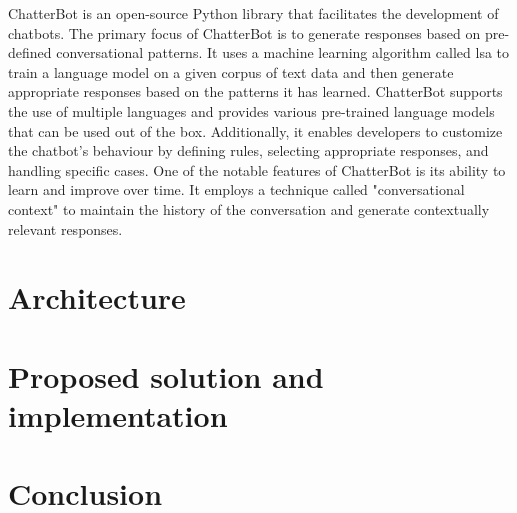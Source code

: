 \documentclass[a4paper,fleqn]{cas-dc}
\begin{document}
ChatterBot \cite{chatterbot} is an open-source Python library that facilitates the development of chatbots. The primary focus of ChatterBot is to generate responses based on pre-defined conversational patterns. It uses a machine learning algorithm called \gls{lsa} to train a language model on a given corpus of text data and  then generate appropriate responses based on the patterns it has learned. ChatterBot supports the use of multiple languages and provides various pre-trained language models that can be used out of the box. Additionally, it enables developers to customize the chatbot's behaviour by defining rules, selecting appropriate responses, and handling specific cases. One of the notable features of ChatterBot is its ability to learn and improve over time. It employs a technique called "conversational context" to maintain the history of the conversation and generate contextually relevant responses. 

\section{Architecture}
\label{architecture}

\section{Proposed solution and implementation}
\label{proposedSolution}

\section{Conclusion}
\label{conclusion}
\printcredits

%
%



\end{document}
